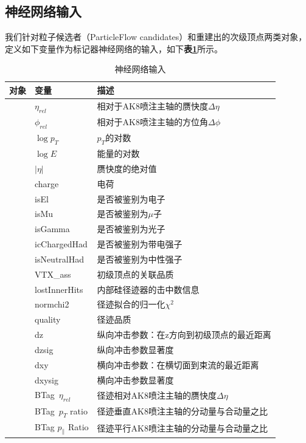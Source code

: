 \subsection{神经网络输入}
我们针对粒子候选者（ParticleFlow candidates）和重建出的次级顶点两类对象，定义如下变量作为标记器神经网络的输入，如下\textbf{表\ref{table:5.1}}所示。
\begin{table}[htbp]
    \caption{神经网络输入\cite{Javier}}\label{table:5.1}
    \centering
    \begin{tabular}{>{\centering\arraybackslash}p{2.5cm}%
    >{\centering\arraybackslash}p{3cm}%
    >{\centering\arraybackslash}p{9cm}}
    \toprule\toprule
    \textbf{对象} & \textbf{变量} & \textbf{描述}\\
    \midrule
    \multirow{25}{*}{粒子候选者} & $\eta_{rel}$ & 相对于AK8喷注主轴的赝快度$\Delta \eta$\\
    & $\phi_{rel}$ & 相对于AK8喷注主轴的方位角$\Delta \phi$\\
    & $\log{p_T}$ & $p_T$的对数\\
    & $\log{E}$ & 能量的对数\\
    & $|\eta|$ & 赝快度的绝对值\\
    & charge & 电荷\\
    & isEl & 是否被鉴别为电子\\
    & isMu & 是否被鉴别为$\mu$子\\
    & isGamma & 是否被鉴别为光子\\
    & icChargedHad & 是否被鉴别为带电强子\\
    & isNeutralHad & 是否被鉴别为中性强子\\
    & VTX\_ass & 初级顶点的关联品质\\
    & lostInnerHits & 内部硅径迹器的击中数信息\\
    & normchi2 & 径迹拟合的归一化$\chi^2$\\
    & quality & 径迹品质\\
    & dz & 纵向冲击参数：在z方向到初级顶点的最近距离\\
    & dzsig & 纵向冲击参数显著度\\
    & dxy & 横向冲击参数：在横切面到束流的最近距离\\
    & dxysig & 横向冲击参数显著度\\
    & BTag\ $\eta_{rel}$ & 径迹相对AK8喷注主轴的赝快度$\Delta \eta$\\
    & BTag\ $p_T$ ratio & 径迹垂直AK8喷注主轴的分动量与合动量之比\\
    & BTag $p_{\parallel}$ Ratio & 径迹平行AK8喷注主轴的分动量与合动量之比\\

\end{tabular}
\end{table}
